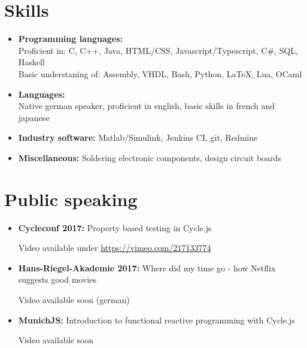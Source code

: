 \documentclass[11pt,a4paper,sans]{moderncv}        %
\begin{document}
\section{Skills}

\vspace{5pt}

\begin{itemize}

\item \textbf{Programming languages:}\\ Proficient in: C, C++, Java, HTML/CSS, Javascript/Typescript, C\#, SQL, Haskell \\ Basic understaning of: Assembly, VHDL, Bash, Python, LaTeX, Lua, OCaml

\vspace{3pt}

\item \textbf{Languages:}\\ Native german speaker, proficient in english, basic skills in french and japanese

\vspace{3pt}

\item \textbf{Industry software:} Matlab/Simulink, Jenkins CI, git, Redmine

\vspace{3pt}

\item \textbf{Miscellaneous:} Soldering electronic components, design circuit boards

\end{itemize}

\section{Public speaking}

\vspace{5pt}

\begin{itemize}

\item{\textbf{Cycleconf 2017:} Property based testing in Cycle.js

    \small{Video available under \url{https://vimeo.com/217133774}}}

\vspace{3pt}

\item{\textbf{Hans-Riegel-Akademie 2017:} Where did my time go - how Netflix suggests good movies

    \small{Video available soon (german)}}

\vspace{3pt}

\item{\textbf{MunichJS:} Introduction to functional reactive programming with Cycle.js

    \small{Video available soon}}

\end{itemize}
\end{document}
